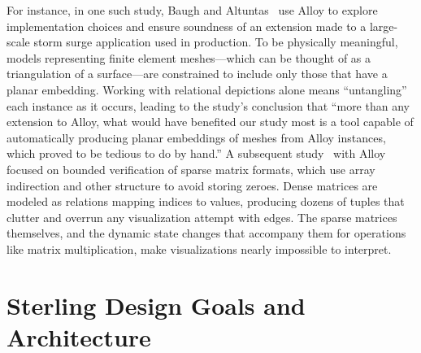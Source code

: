 \documentclass[runningheads]{llncs}
\begin{document}
For instance, in one such study, Baugh and Altuntas~\cite{baugh-scp-2018} use Alloy to explore implementation choices and ensure soundness of an extension made to a large-scale storm surge application used in production.
To be physically meaningful, models representing finite element meshes---which can be thought of as a triangulation of a surface---are constrained to include only those that have a planar embedding.
Working with relational depictions alone means ``untangling'' each instance as it occurs, leading to the study's conclusion that ``more than any extension to Alloy, what would have benefited our study most is a tool capable of automatically producing planar embeddings of meshes from Alloy instances, which proved to be tedious to do by hand.''
A subsequent study~\cite{dyer2019} with Alloy focused on bounded verification of sparse matrix formats, which use array indirection and other structure to avoid storing zeroes.
Dense matrices are modeled as relations mapping indices to values, producing dozens of tuples that clutter and overrun any visualization attempt with edges.
The sparse matrices themselves, and the dynamic state changes that accompany them for operations like matrix multiplication, make visualizations nearly impossible to interpret.


\section{Sterling Design Goals and Architecture}
\label{sterling}

\end{document}
